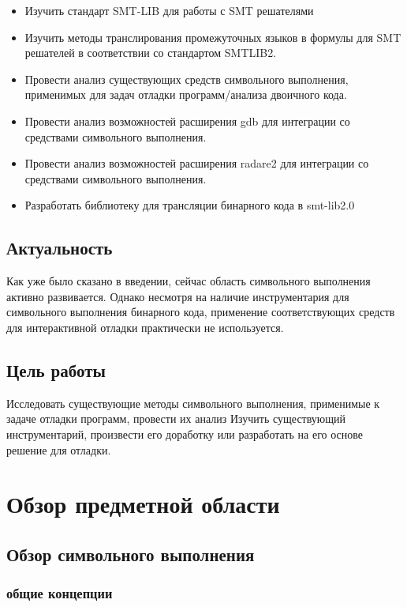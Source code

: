 \begin{itemize}

\item Изучить стандарт SMT-LIB\cite{smtlib} для работы с SMT решателями
\item Изучить методы транслирования промежуточных языков в формулы для SMT решателей в соответствии со стандартом SMTLIB2.
\item Провести анализ существующих средств символьного выполнения, применимых для задач отладки программ/анализа двоичного кода.
\item Провести анализ возможностей расширения gdb для интеграции со средствами символьного выполнения.
\item Провести анализ возможностей расширения radare2 для интеграции со средствами символьного выполнения.
\item Разработать библиотеку для трансляции бинарного кода в smt-lib2.0

\end{itemize}

\subsection{Актуальность}

Как уже было сказано в введении, сейчас область символьного выполнения активно развивается.
Однако несмотря на наличие инструментария для символьного выполнения бинарного кода, применение соответствующих средств для интерактивной отладки практически не используется.

\subsection{Цель работы}

Исследовать существующие методы символьного выполнения, применимые к задаче отладки программ, провести их анализ
Изучить существующий инструментарий, произвести его доработку или разработать на его основе решение для отладки.

\section{Обзор предметной области}

\subsection{Обзор символьного выполнения}

\subsubsection{общие концепции}

